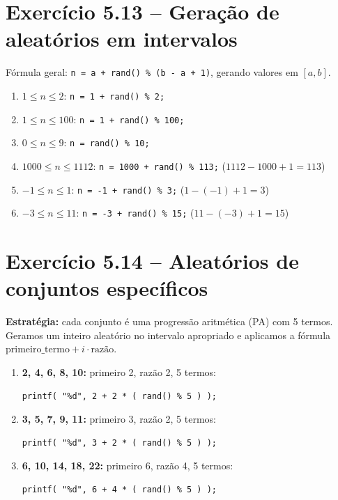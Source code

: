 \documentclass[12pt,a4paper]{article}
\begin{document}
\section{Exercício 5.13 -- Geração de aleatórios em intervalos}

\begin{respostabox}
Fórmula geral: \texttt{n = a + rand() \% (b - a + 1)}, gerando valores em $[a, b]$.

\begin{enumerate}[label=\textbf{\alph*)}]
\item $1 \leq n \leq 2$: \texttt{n = 1 + rand() \% 2;}
\item $1 \leq n \leq 100$: \texttt{n = 1 + rand() \% 100;}
\item $0 \leq n \leq 9$: \texttt{n = rand() \% 10;}
\item $1000 \leq n \leq 1112$: \texttt{n = 1000 + rand() \% 113;} \quad ($1112-1000+1 = 113$)
\item $-1 \leq n \leq 1$: \texttt{n = -1 + rand() \% 3;} \quad ($1-(-1)+1 = 3$)
\item $-3 \leq n \leq 11$: \texttt{n = -3 + rand() \% 15;} \quad ($11-(-3)+1 = 15$)
\end{enumerate}
\end{respostabox}

\section{Exercício 5.14 -- Aleatórios de conjuntos específicos}

\begin{respostabox}
\textbf{Estratégia:} cada conjunto é uma progressão aritmética (PA) com 5 termos.
Geramos um inteiro aleatório no intervalo apropriado e aplicamos a fórmula
$\text{primeiro\_termo} + i \cdot \text{razão}$.

\begin{enumerate}[label=\textbf{\alph*)}]
\item \textbf{2, 4, 6, 8, 10:} primeiro 2, razão 2, 5 termos:
\begin{lstlisting}
printf( "%d", 2 + 2 * ( rand() % 5 ) );
\end{lstlisting}

\item \textbf{3, 5, 7, 9, 11:} primeiro 3, razão 2, 5 termos:
\begin{lstlisting}
printf( "%d", 3 + 2 * ( rand() % 5 ) );
\end{lstlisting}

\item \textbf{6, 10, 14, 18, 22:} primeiro 6, razão 4, 5 termos:
\begin{lstlisting}
printf( "%d", 6 + 4 * ( rand() % 5 ) );
\end{lstlisting}
\end{enumerate}
\end{respostabox}
\end{document}
